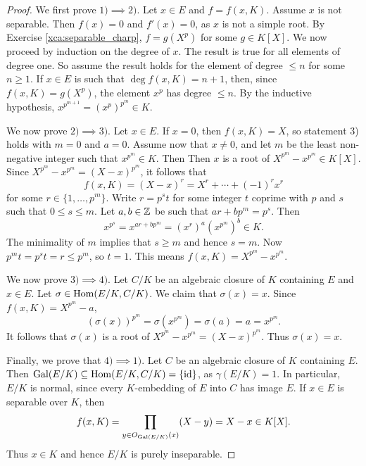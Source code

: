 \begin{proof}
    We first prove $1)\implies 2)$. 
    Let $x\in E$ and $f=f(x,K)$. Assume $x$ is not separable. Then
    $f(x)=0$ and $f'(x)=0$, as $x$ is not a simple root. By Exercise \ref{xca:separable_charp}, 
    $f=g(X^p)$ for some $g\in K[X]$. 
    We now proceed by induction on the degree of $x$. The result
    is true for all elements of degree one. So assume the result holds for the element of degree $\leq n$ 
    for some $n\geq1$. 
    If $x\in E$ is such that $\deg f(x,K)=n+1$, then, since $f(x,K)=g(X^p)$, the element 
    $x^p$ has degree $\leq n$. By the inductive hypothesis, $x^{p^{m+1}}=(x^p)^{p^m}\in K$.  

We now prove $2)\implies 3)$. Let $x\in E$.
If $x=0$, then $f(x,K)=X$, so statement 3) holds
with $m=0$ and $a=0$.
Assume now that $x\ne0$, and let $m$ be the least non-negative
integer such that $x^{p^m}\in K$. Then
    Then
    $x$ is a root of $X^{p^m}-x^{p^m}\in K[X]$. Since 
    $X^{p^m}-x^{p^m}=(X-x)^{p^m}$, it follows that 
    \[
    f(x,K)=(X-x)^r=X^r+\cdots+(-1)^rx^r
    \]
    for some
    $r\in\{1,\dots,p^m\}$. Write $r=p^st$ for some integer $t$ coprime with $p$ and $s$ such that
    $0\leq s\leq m$. Let $a,b\in\mathbb{Z}$ be such that $ar+bp^m=p^s$. Then 
    \[
    x^{p^s}=x^{ar+bp^m}=\left(x^r\right)^a\left(x^{p^m}\right)^b\in K.
    \]
    The minimality of $m$ implies that $s\geq m$ and hence $s=m$. Now $p^mt=p^st=r\leq p^m$, so $t=1$. 
    This means $f(x,K)=X^{p^m}-x^{p^m}$. 
    
    We now prove $3)\implies 4)$. Let $C/K$ be an algebraic closure of $K$ containing $E$ and $x\in E$.  
    Let $\sigma\in\operatorname{Hom}(E/K,C/K)$. We claim that $\sigma(x)=x$. Since 
    $f(x,K)=X^{p^m}-a$, 
    \[
    \left(\sigma(x)\right)^{p^m}=\sigma\left(x^{p^m}\right)=\sigma(a)=a=x^{p^m}.
    \]
    It follows that $\sigma(x)$ is a root of $X^{p^m}-x^{p^m}=(X-x)^{p^m}$. 
    Thus $\sigma(x)=x$. 
    
    Finally, we prove that $4)\implies1)$. Let 
    $C$ be an algebraic closure of $K$ containing $E$. 
    Then $\operatorname{Gal}(E/K)\subseteq\operatorname{Hom}(E/K,C/K)=\{\operatorname{id}\}$,
    as $\gamma(E/K)=1$.
    In particular, $E/K$ is normal, since every $K$-embedding
    of $E$ into $C$ has image $E$.
    If $x\in E$ is separable over $K$, then
    \[
    f(x,K)=\prod_{y\in O_{\operatorname{Gal}(E/K)}(x)}(X-y)=X-x\in K[X].
    \]
    Thus $x\in K$ and hence $E/K$ is purely inseparable.
\end{proof}

